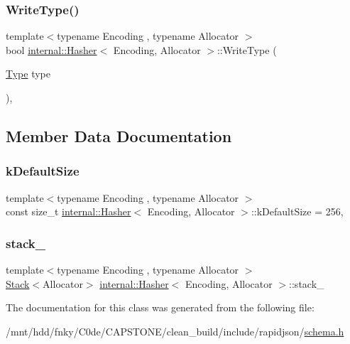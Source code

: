 \subsubsection{\texorpdfstring{Write\+Type()}{WriteType()}}
{\footnotesize\ttfamily template$<$typename Encoding , typename Allocator $>$ \\
bool \hyperlink{classinternal_1_1Hasher}{internal\+::\+Hasher}$<$ Encoding, Allocator $>$\+::Write\+Type (\begin{DoxyParamCaption}\item[{\hyperlink{rapidjson_8h_a1d1cfd8ffb84e947f82999c682b666a7}{Type}}]{type }\end{DoxyParamCaption})\hspace{0.3cm}{\ttfamily [inline]}, {\ttfamily [private]}}



\subsection{Member Data Documentation}
\mbox{\label{classinternal_1_1Hasher_a0a07e0306af8d4a3a87e88423c9e47a7}} 
\subsubsection{\texorpdfstring{k\+Default\+Size}{kDefaultSize}}
{\footnotesize\ttfamily template$<$typename Encoding , typename Allocator $>$ \\
const size\+\_\+t \hyperlink{classinternal_1_1Hasher}{internal\+::\+Hasher}$<$ Encoding, Allocator $>$\+::k\+Default\+Size = 256\hspace{0.3cm}{\ttfamily [static]}, {\ttfamily [private]}}

\mbox{\label{classinternal_1_1Hasher_aeae42411c1a82c0f26d2e0bff68ac4f4}} 
\subsubsection{\texorpdfstring{stack\+\_\+}{stack\_}}
{\footnotesize\ttfamily template$<$typename Encoding , typename Allocator $>$ \\
\hyperlink{classinternal_1_1Stack}{Stack}$<$Allocator$>$ \hyperlink{classinternal_1_1Hasher}{internal\+::\+Hasher}$<$ Encoding, Allocator $>$\+::stack\+\_\+\hspace{0.3cm}{\ttfamily [private]}}



The documentation for this class was generated from the following file\+:\begin{DoxyCompactItemize}
\item 
/mnt/hdd/fnky/\+C0de/\+C\+A\+P\+S\+T\+O\+N\+E/clean\+\_\+build/include/rapidjson/\hyperlink{schema_8h}{schema.\+h}\end{DoxyCompactItemize}
